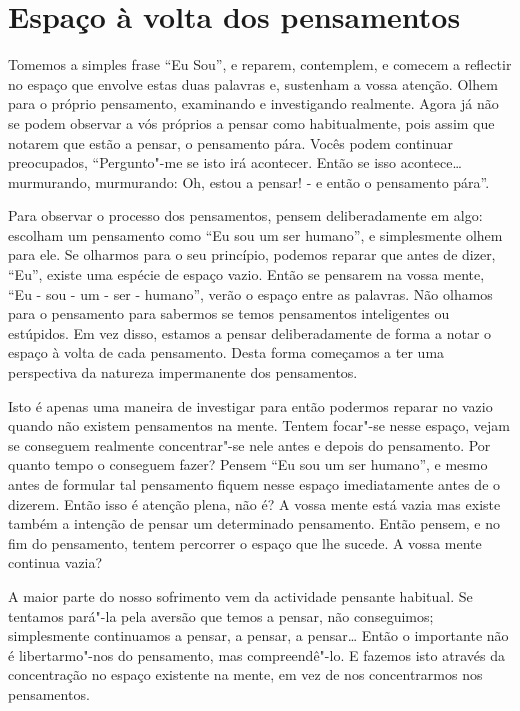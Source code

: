 \section{Espaço à volta dos pensamentos}

Tomemos a simples frase ``Eu Sou'', e reparem, contemplem, e comecem a
reflectir no espaço que envolve estas duas palavras e, sustenham a vossa
atenção. Olhem para o próprio pensamento, examinando e investigando
realmente. Agora já não se podem observar a vós próprios a pensar como
habitualmente, pois assim que notarem que estão a pensar, o pensamento
pára. Vocês podem continuar preocupados, ``Pergunto"-me se isto irá
acontecer. Então se isso acontece\ldots{} murmurando, murmurando: Oh, estou a
pensar! - e então o pensamento pára''.

Para observar o processo dos pensamentos, pensem deliberadamente em
algo: escolham um pensamento como ``Eu sou um ser humano'', e
simplesmente olhem para ele. Se olharmos para o seu princípio, podemos
reparar que antes de dizer, ``Eu'', existe uma espécie de espaço vazio.
Então se pensarem na vossa mente, ``Eu - sou - um - ser - humano'',
verão o espaço entre as palavras. Não olhamos para o pensamento para
sabermos se temos pensamentos inteligentes ou estúpidos. Em vez disso,
estamos a pensar deliberadamente de forma a notar o espaço à volta de
cada pensamento. Desta forma começamos a ter uma perspectiva da natureza
impermanente dos pensamentos.

Isto é apenas uma maneira de investigar para então podermos reparar no
vazio quando não existem pensamentos na mente. Tentem focar"-se nesse
espaço, vejam se conseguem realmente concentrar"-se nele antes e depois
do pensamento. Por quanto tempo o conseguem fazer? Pensem ``Eu sou um
ser humano'', e mesmo antes de formular tal pensamento fiquem nesse
espaço imediatamente antes de o dizerem. Então isso é atenção plena, não
é? A vossa mente está vazia mas existe também a intenção de pensar um
determinado pensamento. Então pensem, e no fim do pensamento, tentem
percorrer o espaço que lhe sucede. A vossa mente continua vazia?

A maior parte do nosso sofrimento vem da actividade pensante habitual.
Se tentamos pará"-la pela aversão que temos a pensar, não conseguimos;
simplesmente continuamos a pensar, a pensar, a pensar\ldots{} Então o
importante não é libertarmo"-nos do pensamento, mas compreendê"-lo. E
fazemos isto através da concentração no espaço existente na mente, em
vez de nos concentrarmos nos pensamentos.

